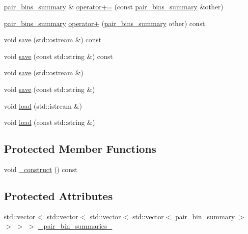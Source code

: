 \begin{DoxyCompactItemize}
\item 
\hyperlink{classIceBRG_1_1pair__bins__summary}{pair\+\_\+bins\+\_\+summary} \& \hyperlink{classIceBRG_1_1pair__bins__summary_a68ecd445cbe2b33b0698188aa0647b24}{operator+=} (const \hyperlink{classIceBRG_1_1pair__bins__summary}{pair\+\_\+bins\+\_\+summary} \&other)
\item 
\hyperlink{classIceBRG_1_1pair__bins__summary}{pair\+\_\+bins\+\_\+summary} \hyperlink{classIceBRG_1_1pair__bins__summary_aa68e04a8182c4eecf874e060dbbffa2c}{operator+} (\hyperlink{classIceBRG_1_1pair__bins__summary}{pair\+\_\+bins\+\_\+summary} other) const 
\item 
void \hyperlink{classIceBRG_1_1pair__bins__summary_a715247f44df3b3aea45ef6f2a9bdd6d7}{save} (std\+::ostream \&) const 
\item 
void \hyperlink{classIceBRG_1_1pair__bins__summary_a17e08424469687b88802862e2175c1e8}{save} (const std\+::string \&) const 
\item 
void \hyperlink{classIceBRG_1_1pair__bins__summary_a987a6e30ce5768bc36c692f424b4d89a}{save} (std\+::ostream \&)
\item 
void \hyperlink{classIceBRG_1_1pair__bins__summary_ae97c13ffd6dbc26905d0b061feef323a}{save} (const std\+::string \&)
\item 
void \hyperlink{classIceBRG_1_1pair__bins__summary_aa1d09ba2a00096bdafa8cd86fd4ce85f}{load} (std\+::istream \&)
\item 
void \hyperlink{classIceBRG_1_1pair__bins__summary_a52231e18dc10d8d5874f910639229332}{load} (const std\+::string \&)
\end{DoxyCompactItemize}
\subsection*{Protected Member Functions}
\begin{DoxyCompactItemize}
\item 
void \hyperlink{classIceBRG_1_1pair__bins__summary_a7fd1953689fbf26462ad42334504b768}{\+\_\+construct} () const 
\end{DoxyCompactItemize}
\subsection*{Protected Attributes}
\begin{DoxyCompactItemize}
\item 
std\+::vector$<$ std\+::vector$<$ std\+::vector$<$ std\+::vector$<$ \hyperlink{classIceBRG_1_1pair__bin__summary}{pair\+\_\+bin\+\_\+summary} $>$ $>$ $>$ $>$ \hyperlink{classIceBRG_1_1pair__bins__summary_ae48646da7b9c9cb88fc5987a49152da0}{\+\_\+pair\+\_\+bin\+\_\+summaries\+\_\+}
\end{DoxyCompactItemize}
